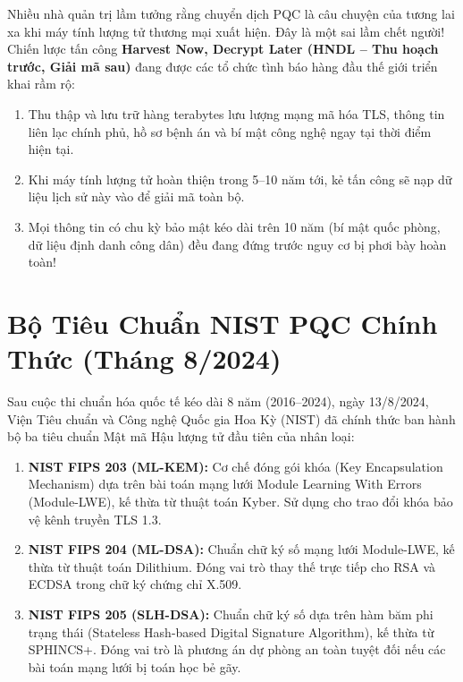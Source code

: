 Nhiều nhà quản trị lầm tưởng rằng chuyển dịch PQC là câu chuyện của tương lai xa khi máy tính lượng tử thương mại xuất hiện. Đây là một sai lầm chết người!\\
Chiến lược tấn công \textbf{Harvest Now, Decrypt Later (HNDL -- Thu hoạch trước, Giải mã sau)} đang được các tổ chức tình báo hàng đầu thế giới triển khai rầm rộ:
\begin{enumerate}
  \item Thu thập và lưu trữ hàng terabytes lưu lượng mạng mã hóa TLS, thông tin liên lạc chính phủ, hồ sơ bệnh án và bí mật công nghệ ngay tại thời điểm hiện tại.
  \item Khi máy tính lượng tử hoàn thiện trong 5--10 năm tới, kẻ tấn công sẽ nạp dữ liệu lịch sử này vào để giải mã toàn bộ.
  \item Mọi thông tin có chu kỳ bảo mật kéo dài trên 10 năm (bí mật quốc phòng, dữ liệu định danh công dân) đều đang đứng trước nguy cơ bị phơi bày hoàn toàn!
\end{enumerate}

\section{Bộ Tiêu Chuẩn NIST PQC Chính Thức (Tháng 8/2024)}

Sau cuộc thi chuẩn hóa quốc tế kéo dài 8 năm (2016--2024), ngày 13/8/2024, Viện Tiêu chuẩn và Công nghệ Quốc gia Hoa Kỳ (NIST) đã chính thức ban hành bộ ba tiêu chuẩn Mật mã Hậu lượng tử đầu tiên của nhân loại:
\begin{enumerate}
  \item \textbf{NIST FIPS 203 (ML-KEM):} Cơ chế đóng gói khóa (Key Encapsulation Mechanism) dựa trên bài toán mạng lưới Module Learning With Errors (Module-LWE), kế thừa từ thuật toán Kyber. Sử dụng cho trao đổi khóa bảo vệ kênh truyền TLS 1.3.
  \item \textbf{NIST FIPS 204 (ML-DSA):} Chuẩn chữ ký số mạng lưới Module-LWE, kế thừa từ thuật toán Dilithium. Đóng vai trò thay thế trực tiếp cho RSA và ECDSA trong chữ ký chứng chỉ X.509.
  \item \textbf{NIST FIPS 205 (SLH-DSA):} Chuẩn chữ ký số dựa trên hàm băm phi trạng thái (Stateless Hash-based Digital Signature Algorithm), kế thừa từ SPHINCS+. Đóng vai trò là phương án dự phòng an toàn tuyệt đối nếu các bài toán mạng lưới bị toán học bẻ gãy.
\end{enumerate}

